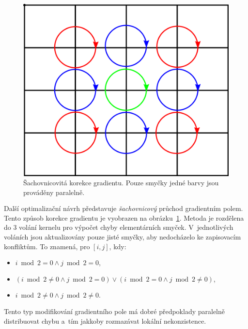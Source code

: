\documentclass[11pt,a4paper,oneside]{article}
\begin{document}
	\begin{figure}[htb]
		\centering
		\includegraphics[scale=0.3]{fig/chess.png}
		\caption{Šachovnicovitá korekce gradientu. Pouze smyčky jedné barvy jsou prováděny paralelně.}
		\label{fig:chess}
	\end{figure}

	Další optimalizační návrh představuje \emph{šachovnicový} průchod gradientním polem. Tento způsob
	korekce gradientu je vyobrazen na obrázku~\ref{fig:chess}. Metoda je rozdělena do 3 volání kernelu
	pro výpočet chyby elementárních smyček. V~jednotlivých voláních jsou aktualizovány pouze jisté smyčky,
	aby nedocházelo ke zapisovacím konfliktům. To znamená, pro $[i, j]$, kdy:
	\begin{itemize}
		\item $i \bmod 2 = 0 \wedge j \bmod 2 = 0$,
		\item $(i \bmod 2 \neq 0 \wedge j \bmod 2 = 0) \lor (i \bmod 2 = 0 \wedge j \bmod 2 \neq 0)$,
		\item $i \bmod 2 \neq 0 \wedge j \bmod 2 \neq 0$.
	\end{itemize}
	Tento typ modifikování gradientního pole má dobré předpoklady paralelně distribuovat chybu
	a~tím jakkoby rozmazávat lokální nekonzistence.
\end{document}
